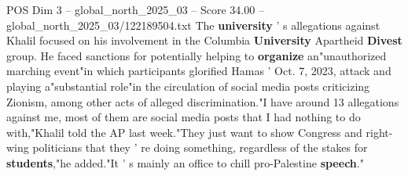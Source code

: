 \begin{textsample}{POS Dim 3 – global\_north\_2025\_03 – Score 34.00 – global\_north\_2025\_03/122189504.txt}
The \textbf{university} ' s allegations against Khalil focused on his involvement in the Columbia \textbf{University} Apartheid \textbf{Divest} group.
He faced sanctions for potentially helping to \textbf{organize} an"unauthorized marching event"in which participants glorified Hamas ' Oct. 7, 2023, attack and playing a"substantial role"in the circulation of social media posts criticizing Zionism, among other acts of alleged discrimination."I have around 13 allegations against me, most of them are social media posts that I had nothing to do with,"Khalil told the AP last week."They just want to show Congress and right-wing politicians that they ' re doing something, regardless of the stakes for \textbf{students},"he added."It ' s mainly an office to chill pro-Palestine \textbf{speech}."

\end{textsample}
